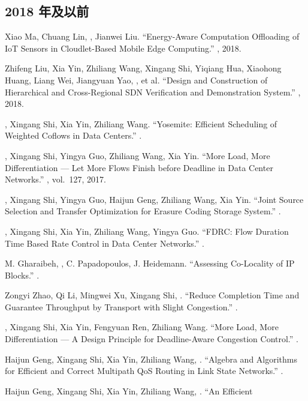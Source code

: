 \documentclass[11pt]{article}
\begin{document}
\subsection*{2018 年及以前}
\begin{publist}
\item Xiao Ma, Chuang Lin, \corr, Jianwei Liu. ``Energy-Aware
Computation Offloading of IoT Sensors in Cloudlet-Based Mobile Edge Computing.''
, 2018.
\item Zhifeng Liu, Xia Yin, Zhiliang Wang, Xingang Shi, Yiqiang Hua, Xiaohong Huang,
Liang Wei, Jiangyuan Yao, , et al. ``Design and Construction of
Hierarchical and Cross-Regional SDN Verification and Demonstration System.''
, 2018.
\item {}, Xingang Shi\corr, Xia Yin, Zhiliang Wang. ``Yosemite: Efficient
Scheduling of Weighted Coflows in Data Centers.'' .
\item {}, Xingang Shi\corr, Yingya Guo, Zhiliang Wang, Xia Yin. ``More
Load, More Differentiation --- Let More Flows Finish before Deadline in Data Center
Networks.'' , vol.~127, 2017.
\item {}, Xingang Shi, Yingya Guo, Haijun Geng, Zhiliang Wang, Xia Yin.
``Joint Source Selection and Transfer Optimization for Erasure Coding Storage
System.'' .
\item {}, Xingang Shi, Xia Yin, Zhiliang Wang, Yingya Guo. ``FDRC: Flow
Duration Time Based Rate Control in Data Center Networks.'' .
\item M. Gharaibeh, , C. Papadopoulos, J. Heidemann. ``Assessing
Co-Locality of IP Blocks.'' .
\item Zongyi Zhao, Qi Li, Mingwei Xu, Xingang Shi, . ``Reduce Completion
Time and Guarantee Throughput by Transport with Slight Congestion.''
.
\item {}, Xingang Shi, Xia Yin, Fengyuan Ren, Zhiliang Wang. ``More Load,
More Differentiation --- A Design Principle for Deadline-Aware Congestion Control.''
.
\item Haijun Geng, Xingang Shi, Xia Yin, Zhiliang Wang, . ``Algebra and
Algorithms for Efficient and Correct Multipath QoS Routing in Link State Networks.''
.
\item Haijun Geng, Xingang Shi, Xia Yin, Zhiliang Wang, . ``An Efficient

\end{publist}
\end{document}
